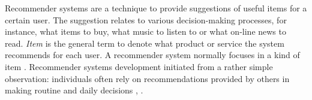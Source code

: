 Recommender systems are a technique to provide suggestions of 
useful items for a certain user. The suggestion relates to various
decision-making processes, for instance, what items to buy, what music
to listen to or what on-line news to read. \textit{Item} is the general
term to denote what product or service the system recommends for each
user. A recommender system normally focuses in a kind of item \cite{resnick1997recommender}.
Recommender systems development initiated from a rather simple
observation: individuals often rely on recommendations provided by
others in making routine and daily decisions \cite{mahmood2009improving},
\cite{mcsherry2009differentially}. 
